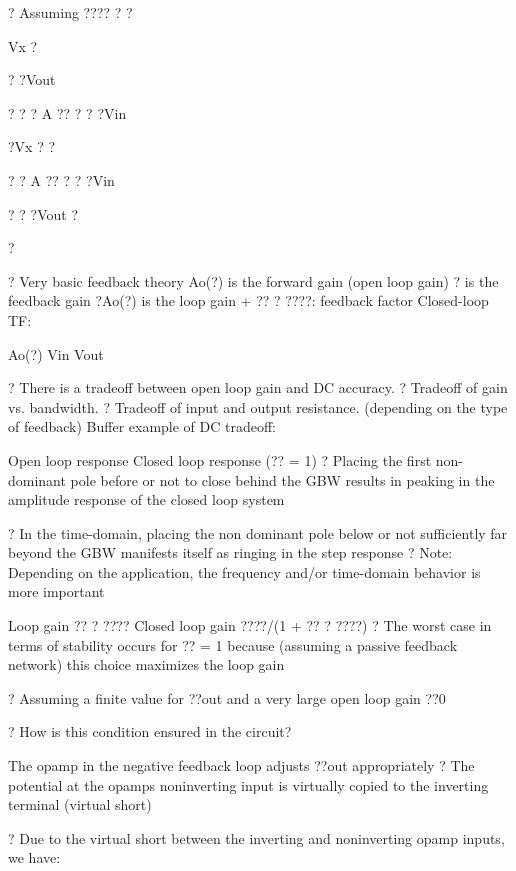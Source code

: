 \documentclass[2pt,landscape]{article}
\begin{document}
\begin{multicols*}{5}
?	Assuming ???? ? ?


Vx ?


? ?Vout


? ? ? A ?? ? ? 
?Vin


?Vx ? ?


? ? A ?? ? ? ?Vin


?	? ?Vout ?



? 


?	Very basic feedback theory
\textbullet 	Ao(?) is the forward gain (open loop gain)
\textbullet 	? is the feedback gain
\textbullet 	?\textbullet Ao(?) is the loop gain
 + ?? ? ????: feedback factor
\textbullet 	Closed-loop TF:


Ao(?)
Vin	Vout


?	There is a tradeoff between open loop 
gain and DC accuracy.
?	Tradeoff of gain vs. bandwidth.
?	Tradeoff of input and output resistance. 
(depending on the type of feedback)
Buffer example of DC tradeoff:




Open loop response	Closed loop response (?? = 1)
?	Placing the first non-dominant pole before or not to close behind the 
GBW results in peaking in the amplitude response of the closed loop 
system





?	In the time-domain, placing the non dominant pole below or not 
sufficiently far beyond the GBW manifests itself as ringing in the step 
response
?	Note: Depending on the application, the frequency and/or time-domain
behavior is more important



Loop gain ?? ? ????	Closed loop gain ????/(1 + ?? ? ????)
?	The worst case in terms of stability occurs for ?? = 1 because 
(assuming a passive feedback network) this choice maximizes the loop 
gain




?	Assuming a finite value for ??out and a very large open loop gain ??0

?	How is this condition ensured in the circuit?

The opamp in the negative feedback loop adjusts ??out  appropriately
?	The potential at the opamp\textbullet s noninverting input is virtually copied to 
the inverting terminal (virtual short)





?	Due to the virtual short between the inverting and noninverting opamp 
inputs, we have:




\end{multicols*}
\end{document}
